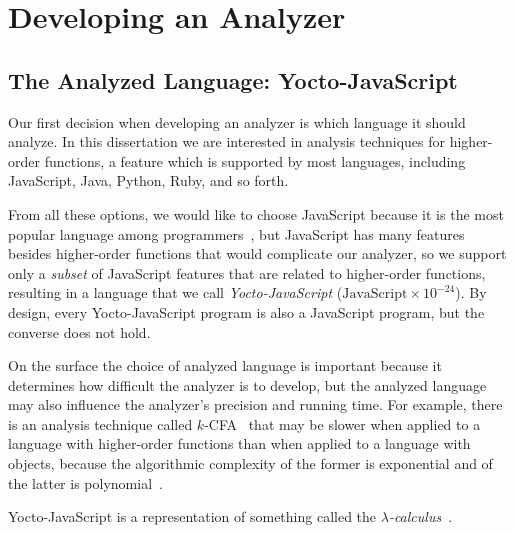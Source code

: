 \documentclass[12pt, oneside]{book}
\begin{document}

\chapter{Developing an Analyzer}


\section{The Analyzed Language: Yocto-JavaScript}
\label{The Analyzed Language: Yocto-JavaScript}

Our first decision when developing an analyzer is which language it should analyze. In this dissertation we are interested in analysis techniques for higher-order functions, a feature which is supported by most languages, including JavaScript, Java, Python, Ruby, and so forth.

From all these options, we would like to choose JavaScript because it is the most popular language among programmers~\cite{stack-overflow-developer-survey, jet-brains-developer-survey}, but JavaScript has many features besides higher-order functions that would complicate our analyzer, so we support only a \emph{subset} of JavaScript features that are related to higher-order functions, resulting in a language that we call \emph{Yocto-JavaScript} ($\mathrm{JavaScript} \times 10^{-24}$). By design, every Yocto-JavaScript program is also a JavaScript program, but the converse does not hold.

\begin{mdframed}[frametitle = {Advanced}]
On the surface the choice of analyzed language is important because it determines how difficult the analyzer is to develop, but the analyzed language may also influence the analyzer’s precision and running time. For example, there is an analysis technique called $k$-CFA~\cite{k-cfa} that may be slower when applied to a language with higher-order functions than when applied to a language with objects, because the algorithmic complexity of the former is exponential and of the latter is polynomial~\cite{m-cfa}.
\end{mdframed}

\begin{mdframed}[frametitle = {Technical Terms}]
Yocto-JavaScript is a representation of something called the \emph{$\lambda$-calculus}~\cite[§~6]{understanding-computation}.
\end{mdframed}
\end{document}
